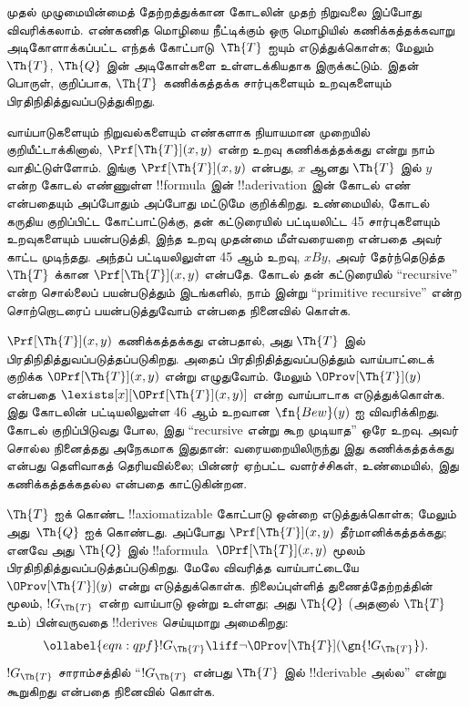 \documentclass[../../../include/open-logic-section]{subfiles}
\begin{document}



முதல் முழுமையின்மைத் தேற்றத்துக்கான கோடலின் முதற் நிறுவலை இப்போது
விவரிக்கலாம். எண்கணித மொழியை நீட்டிக்கும் ஒரு மொழியில்
கணிக்கத்தக்கவாறு அடிகோளாக்கப்பட்ட எந்தக் கோட்பாடு~$\Th{T}$ ஐயும்
எடுத்துக்கொள்க; மேலும் $\Th{T}$, $\Th{Q}$ இன் அடிகோள்களை
உள்ளடக்கியதாக இருக்கட்டும். இதன் பொருள், குறிப்பாக, $\Th{T}$
கணிக்கத்தக்க சார்புகளையும் உறவுகளையும் பிரதிநிதித்துவப்படுத்துகிறது.

வாய்பாடுகளையும் நிறுவல்களையும் எண்களாக நியாயமான முறையில்
குறியீட்டாக்கினால், $\Prf[\Th{T}](x,y)$ என்ற உறவு கணிக்கத்தக்கது
என்று நாம் வாதிட்டுள்ளோம். இங்கு
$\Prf[\Th{T}](x,y)$ என்பது, $x$ ஆனது $\Th{T}$ இல்
$y$ என்ற கோடல் எண்ணுள்ள !!{formula} இன் !!a{derivation} இன்
கோடல் எண் என்பதையும் அப்போதும் அப்போது மட்டுமே குறிக்கிறது.
உண்மையில், கோடல் கருதிய குறிப்பிட்ட கோட்பாட்டுக்கு, தன்
கட்டுரையில் பட்டியலிட்ட 45 சார்புகளையும் உறவுகளையும் பயன்படுத்தி,
இந்த உறவு முதன்மை மீள்வரையறை என்பதை அவர் காட்ட முடிந்தது. அந்தப்
பட்டியலிலுள்ள 45 ஆம் உறவு, $x B y$, அவர் தேர்ந்தெடுத்த
$\Th{T}$ க்கான $\Prf[\Th{T}](x,y)$ என்பதே. கோடல் தன் கட்டுரையில்
“recursive” என்ற சொல்லைப் பயன்படுத்தும் இடங்களில், நாம் இன்று
“primitive recursive” என்ற சொற்றொடரைப் பயன்படுத்துவோம் என்பதை
நினைவில் கொள்க.

$\Prf[\Th{T}](x,y)$ கணிக்கத்தக்கது என்பதால், அது $\Th{T}$ இல்
பிரதிநிதித்துவப்படுத்தப்படுகிறது. அதைப் பிரதிநிதித்துவப்படுத்தும்
வாய்பாட்டைக் குறிக்க $\OPrf[\Th{T}](x,y)$ என்று எழுதுவோம். மேலும்
$\OProv[\Th{T}](y)$ என்பதை
$\lexists[x][\OPrf[\Th{T}](x,y)]$ என்ற வாய்பாடாக எடுத்துக்கொள்க.
இது கோடலின் பட்டியலிலுள்ள 46 ஆம் உறவான
$\fn{Bew}(y)$ ஐ விவரிக்கிறது. கோடல் குறிப்பிடுவது போல, இது
“recursive என்று கூற முடியாத” ஒரே உறவு. அவர் சொல்ல நினைத்தது
அநேகமாக இதுதான்: வரையறையிலிருந்து இது கணிக்கத்தக்கது என்பது
தெளிவாகத் தெரியவில்லை; பின்னர் ஏற்பட்ட வளர்ச்சிகள், உண்மையில்,
இது கணிக்கத்தக்கதல்ல என்பதை காட்டுகின்றன.

	$\Th{T}$ ஐக் கொண்ட !!{axiomatizable} கோட்பாடு ஒன்றை எடுத்துக்கொள்க;
	மேலும் அது~$\Th{Q}$ ஐக் கொண்டது.
அப்போது $\Prf[\Th{T}](x, y)$ தீர்மானிக்கத்தக்கது; எனவே அது
$\Th{Q}$ இல் !!a{formula}~$\OPrf[\Th{T}](x, y)$ மூலம்
பிரதிநிதித்துவப்படுத்தப்படுகிறது. மேலே விவரித்த வாய்பாட்டையே
$\OProv[\Th{T}](y)$ என்று எடுத்துக்கொள்க. நிலைப்புள்ளித்
துணைத்தேற்றத்தின் மூலம், $!G_\Th{T}$ என்ற வாய்பாடு ஒன்று உள்ளது;
அது $\Th{Q}$ (அதனால் $\Th{T}$ உம்) பின்வருவதை !!{derive}s
செய்யுமாறு அமைகிறது:
\begin{equation}
\ollabel{eqn:qpf}
!G_\Th{T} \liff \lnot \OProv[\Th{T}](\gn{!G_\Th{T}}).
\end{equation}
$!G_\Th{T}$ சாராம்சத்தில் “$!G_\Th{T}$ என்பது $\Th{T}$ இல்
!!{derivable} அல்ல” என்று கூறுகிறது என்பதை நினைவில் கொள்க.
\end{document}
